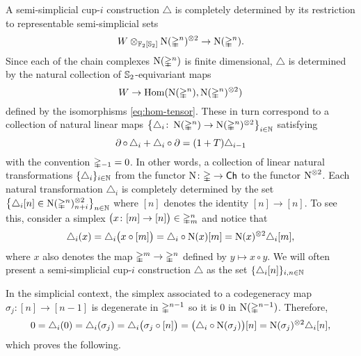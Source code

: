 A semi-simplicial cup-$i$ construction $\triangle$ is completely determined by its restriction to representable semi-simplicial sets
\[
W \ot_{\Ftwo[\Sym_2]} \chains(\simplex^n)^{\ot 2} \to \chains(\simplex^n).
\]
Since each of the chain complexes $\chains(\simplex^n)$ is finite dimensional, $\triangle$ is determined by the natural collection of $\Sym_2$-equivariant maps
\[
W \to \Hom(\chains(\simplex^n), \chains(\simplex^n)^{\ot 2})
\]
defined by the isomorphisms \eqref{eq:hom-tensor}.
These in turn correspond to a collection of natural linear maps $\set[\big]{\triangle_i \colon \chains(\simplex^n) \to \chains(\simplex^n)^{\ot 2}}_{i \in \N}$ satisfying
\[
\bd \circ \, \triangle_i + \triangle_i \circ \bd =
(1+T) \triangle_{i-1}
\]
with the convention $\simplex_{-1} = 0$.
In other words, a collection of linear natural transformations $\set{\triangle_i}_{i\in\N}$ from the functor $\chains \colon \simplex \to \Ch$ to the functor $\chains^{\ot 2}$.
Each natural transformation $\triangle_i$ is completely determined by the set $\set[\big]{\triangle_i[n] \in \chains(\simplex^n)^{\ot 2}_{n+i}}_{n\in\N}$ where $[n]$ denotes the identity $[n] \to [n]$.
%
%
%
To see this, consider a simplex $\big(x \colon [m] \to [n] \big) \in \simplex^n_m$ and notice that
\[
\triangle_i(x) = \triangle_i \big( x \circ [m] \big) =
\triangle_i \circ \chains(x) [m] =
\chains(x)^{\ot 2} \triangle_i[m],
\]
where $x$ also denotes the map $\simplex^m \to \simplex^n$ defined by $y \mapsto x \circ y$.
We will often present a semi-simplicial cup-$i$ construction $\triangle$ as the set $\set{\triangle_i[n]}_{i,n\in\N}$

In the simplicial context, the simplex associated to a codegeneracy map $\sigma_j \colon [n] \to [n-1]$ is degenerate in $\simplex^{n-1}$ so it is $0$ in $\chains(\simplex^{n-1})$.
Therefore,
\[
0 = \triangle_i(0) = \triangle_i(\sigma_j) =
\triangle_i \big( \sigma_j \circ [n] \big) =
\big( \triangle_i \circ \chains(\sigma_j) \big) [n] =
\chains(\sigma_j)^{\ot 2} \triangle_i[n],
\]
which proves the following.

